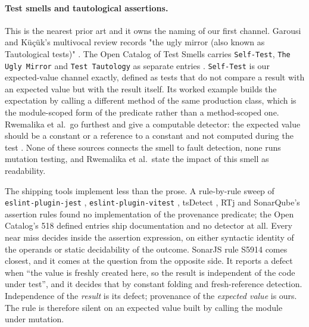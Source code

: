 \documentclass[12pt]{article}
\begin{document}
\paragraph{Test smells and tautological assertions.} This is the nearest prior
art and it owns the naming of our first channel. Garousi and K\"u\c{c}\"uk's
multivocal review records "the ugly mirror (also known as Tautological tests)"
\cite{garousi2018}. The Open Catalog of Test Smells carries \texttt{Self-Test},
\texttt{The Ugly Mirror} and \texttt{Test Tautology} as separate entries
\cite{soares2023catalog}. \texttt{Self-Test} is our expected-value channel
exactly, defined as tests that do not compare a result with an expected value but
with the result itself. Its worked example builds the expectation by calling a
different method of the same production class, which is the module-scoped form of
the predicate rather than a method-scoped one. Rwemalika et al.\ go furthest and give a computable
detector: the expected value should be a constant or a reference to a constant
and not computed during the test \cite{rwemalika2021}. None of these sources
connects the smell to fault detection, none runs mutation testing, and Rwemalika et al.\ state the impact of this smell as readability.

The shipping tools implement less than the prose. A rule-by-rule sweep of
\texttt{eslint-plugin-jest} \cite{eslintjest-artifact},
\texttt{eslint-plugin-vitest} \cite{eslintvitest-artifact}, tsDetect
\cite{tsdetect-artifact}, RTj \cite{rtj-artifact,martinez2020rtj} and SonarQube's
assertion rules \cite{sonarjs-artifact} found no implementation of the provenance
predicate; the Open Catalog's 518 defined entries ship documentation and no detector at
all. Every near miss decides inside the assertion expression, on either syntactic
identity of the operands or static decidability of the outcome. SonarJS rule
S5914 comes closest, and it comes at the question from the opposite side. It
reports a defect when ``the value is freshly created here, so the result is
independent of the code under test'', and it decides that by constant folding and
fresh-reference detection. Independence of the \emph{result} is its defect;
provenance of the \emph{expected value} is ours. The rule is therefore silent on
an expected value built by calling the module under mutation.
\end{document}
